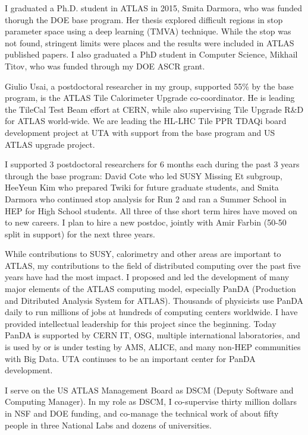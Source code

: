 I graduated a Ph.D. student in ATLAS in 2015, Smita Darmora, who was funded thorugh the DOE base program. Her thesis explored difficult regions in stop parameter space using a deep learning (TMVA) technique. While the stop was not found, stringent limits were places and the results were included in ATLAS published papers. I also graduated a PhD student in Computer Science, Mikhail Titov, who was funded through my DOE ASCR grant.

Giulio Usai, a postdoctoral researcher in my group, supported 55\% by the base program, is the ATLAS Tile Calorimeter Upgrade co-coordinator. He is leading the TileCal Test Beam effort at CERN, while also supervising Tile Upgrade R\&D for ATLAS world-wide. We are leading the HL-LHC Tile PPR TDAQi board development project at UTA with support from the base program and US ATLAS upgrade project.

I supported 3 postdoctoral researchers for 6 months each during the past 3 years through the base program: David Cote who led SUSY Missing Et subgroup, HeeYeun Kim who prepared Twiki for future graduate students, and Smita Darmora who continued stop analysis for Run 2 and ran a Summer School in HEP for High School students. All three of thse short term hires have moved on to new careers. I plan to hire a new postdoc, jointly with Amir Farbin (50-50 split in support) for the next three years.

While contributions to SUSY, calorimetry and other areas are important to ATLAS, my contributions to the field of distributed computing over the past five years have had the most impact. I proposed and led the development of many major elements of the ATLAS computing model, especially PanDA (Production and Ditributed Analysis System for ATLAS). Thousands of physicists use PanDA daily to run millions of jobs at hundreds of computing centers worldwide. I have provided intellectual leadership for this project since the beginning. Today PanDA is supported by CERN IT, OSG, multiple international laboratories, and is used by or is under testing by AMS, ALICE, and many non-HEP communities with Big Data. UTA continues to be an important center for PanDA development.

I serve on the US ATLAS Management Board as DSCM (Deputy Software and Computing Manager). In my role as DSCM, I co-supervise thirty million dollars in NSF and DOE funding, and co-manage the technical work of about fifty people in three National Labs and dozens of universities.


